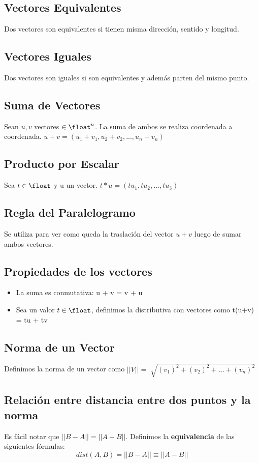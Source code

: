 \documentclass[10pt,a4paper]{article}
\begin{document}
\subsection*{Vectores Equivalentes}
Dos vectores son equivalentes si tienen misma dirección, sentido y longitud. 
\subsection*{Vectores Iguales}
Dos vectores son iguales si son equivalentes y además parten del mismo punto.
\subsection*{Suma de Vectores}
Sean $ u, v $ vectores $\in \float^{n}$. La suma de ambos se realiza coordenada a coordenada.
$ u + v = (u_{1} + v_{1}, u_{2} + v_{2}, ..., u_{n} + v_{n})$
\subsection*{Producto por Escalar}
Sea $t \in \float$ y u un vector.
$ t * u = (tu_{1}, tu_{2}, ..., tu_{3})$
\subsection*{Regla del Paralelogramo}
Se utiliza para ver como queda la traslación del vector $u+v$ luego de sumar ambos vectores.
\subsection*{Propiedades de los vectores}
\begin{itemize}
    \item La suma es conmutativa: u + v = v + u
    \item Sea un valor $ t \in \float $, definimos la distributiva con vectores como t(u+v) = tu + tv
\end{itemize}
\subsection*{Norma de un Vector}
Definimos la norma de un vector como $ || V || = \sqrt[]{(v_{1})^{2} + (v_{2})^2 + ... + (v_{n})^2}$ 
\subsection*{Relación entre distancia entre dos puntos y la norma}
Es fácil notar que $ ||B-A|| = ||A-B||. $ 
Definimos la \textbf{equivalencia} de las siguientes fórmulas: 
\[ dist(A, B) = ||B-A|| \equiv ||A-B|| \]
\end{document}
